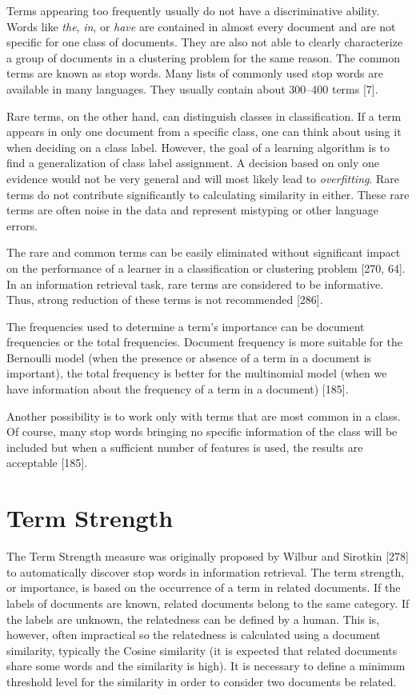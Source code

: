 \documentclass[11pt,openany,executivepaper]{book}
\begin{document}
Terms appearing too frequently usually do not have a discriminative ability. Words like \emph{the}, \emph{in}, or \emph{have} are contained in almost every document and are not specific for one class of documents. They are also not able to clearly characterize a group of documents in a clustering problem for the same reason. The common terms are known as stop words. Many lists of commonly used stop words are available in many languages. They usually contain about 300--400 terms [7].

Rare terms, on the other hand, can distinguish classes in classification. If a term appears in only one document from a specific class, one can think about using it when deciding on a class label. However, the goal of a learning algorithm is to find a generalization of class label assignment. A decision based on only one evidence would not be very general and will most likely lead to \emph{overfitting}. Rare terms do not contribute significantly to calculating similarity in either. These rare terms are often noise in the data and represent mistyping or other language errors.

The rare and common terms can be easily eliminated without significant impact on the performance of a learner in a classification or clustering problem [270, 64]. In an information retrieval task, rare terms are considered to be informative. Thus, strong reduction of these terms is not recommended [286].

The frequencies used to determine a term's importance can be document frequencies or the total frequencies. Document frequency is more suitable for the Bernoulli model (when the presence or absence of a term in a document is important), the total frequency is better for the multinomial model (when we have information about the frequency of a term in a document) [185].

Another possibility is to work only with terms that are most common in a class. Of course, many stop words bringing no specific information of the class will be included but when a sufficient number of features is used, the results are acceptable [185].

\section{Term Strength}

The Term Strength measure was originally proposed by Wilbur and Sirotkin [278] to automatically discover stop words in information retrieval. The term strength, or importance, is based on the occurrence of a term in related documents. If the labels of documents are known, related documents belong to the same category. If the labels are unknown, the relatedness can be defined by a human. This is, however, often impractical so the relatedness is calculated using a document similarity, typically the Cosine similarity (it is expected that related documents share some words and the similarity is high). It is necessary to define a minimum threshold level for the similarity in order to consider two documents be related.
\end{document}
